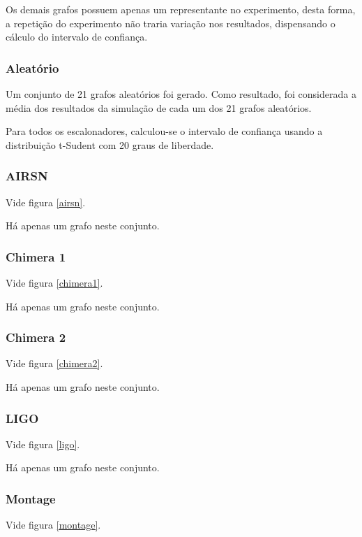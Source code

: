 \documentclass[a4paper,10pt]{article}
\begin{document}
Os demais grafos possuem apenas um representante no experimento, desta forma, a repetição do experimento não traria
variação nos resultados, dispensando o cálculo do intervalo de confiança.

\subsubsection{Aleatório}
\label{grafaleatorio}

Um conjunto de 21 grafos aleatórios foi gerado. Como resultado, foi considerada a média dos resultados
da simulação de cada um dos 21 grafos aleatórios.

Para todos os escalonadores, calculou-se o intervalo de confiança usando a distribuição t-Sudent com
20 graus de liberdade.

\subsubsection{AIRSN}

Vide figura \ref{airsn}.

Há apenas um grafo neste conjunto.

\subsubsection{Chimera 1}

Vide figura \ref{chimera1}.

Há apenas um grafo neste conjunto.

\subsubsection{Chimera 2}

Vide figura \ref{chimera2}.

Há apenas um grafo neste conjunto.

\subsubsection{LIGO}

Vide figura \ref{ligo}.

Há apenas um grafo neste conjunto.

\subsubsection{Montage}

Vide figura \ref{montage}.
\end{document}
